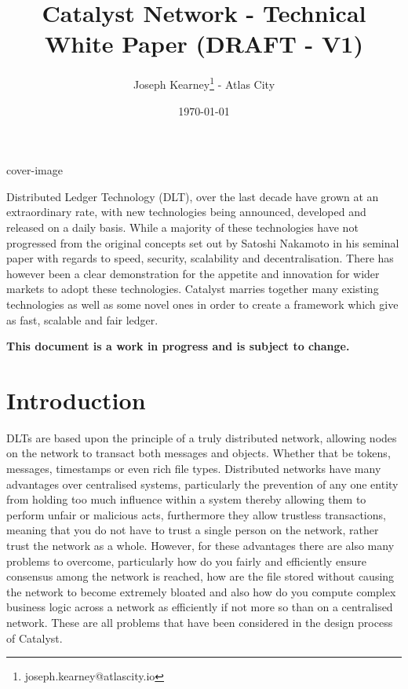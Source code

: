 \documentclass{article}
\title{\textbf{Catalyst Network - Technical White Paper (DRAFT - V1)}}
\date{\today}
\author{Joseph Kearney\thanks{joseph.kearney@atlascity.io} - Atlas City}
\begin{document}
 {cover-image}

\maketitle

\abstract 

Distributed Ledger Technology (DLT), over the last decade have grown at an extraordinary rate, with new technologies being announced, developed and released on a daily basis. While a majority of these technologies have not progressed from the original concepts set out by Satoshi Nakamoto in his seminal paper \cite{nakamoto2008bitcoin} with regards to speed, security, scalability and decentralisation. There has however been a clear demonstration for the appetite and innovation for wider markets to adopt these technologies. Catalyst marries together many existing technologies as well as some novel ones in order to create a framework which give as fast, scalable and fair ledger.

\begin{center}
\vspace{50mm}
\textbf{This document is a work in progress and is subject to change.}
\end{center}

\newpage

\tableofcontents

\newpage

\section*{Introduction}

DLTs are based upon the principle of a truly distributed network, allowing nodes on the network to transact both messages and objects. Whether that be tokens, messages, timestamps or even rich file types. Distributed networks have many advantages over centralised systems, particularly the prevention of any one entity from holding too much influence within a system thereby allowing them to perform unfair or malicious acts, furthermore they allow trustless transactions, meaning that you do not have to trust a single person on the network, rather trust the network as a whole. However, for these advantages there are also many problems to overcome, particularly how do you fairly and efficiently ensure consensus among the network is reached, how are the file stored without causing the network to become extremely bloated and also how do you compute complex business logic across a network as efficiently if not more so than on a centralised network. These are all problems that have been considered in the design process of Catalyst. \\ 
\end{document}
